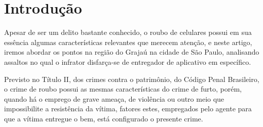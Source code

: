 \section{Introdução}

Apesar de ser um delito bastante conhecido, o roubo de celulares possui em sua 
essência algumas características relevantes que merecem atenção, e neste artigo,
iremos abordar os pontos na região do Grajaú na cidade de São Paulo, analisando
assaltos no qual o infrator disfarça-se de entregador de aplicativo em específico.

Previsto no Título II, dos crimes contra o patrimônio, do Código Penal Brasileiro,
o crime de roubo possui as mesmas características do crime de furto, porém, quando 
há o emprego de grave ameaça, de violência ou outro meio que impossibilite a 
resistência da vítima, fatores estes, empregados pelo agente para que a vítima 
entregue o bem, está configurado o presente crime.

% 

 